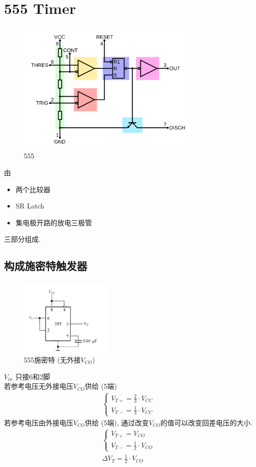 \documentclass[scheme=chinese,a4paper]{report}
\begin{document}
\section{555 Timer}
\begin{figure}[H]
\centering
\includegraphics[width=0.8\textwidth]{555_timer_1.png}
\caption{555}
\end{figure}
由
\begin{itemize}
    \item 两个比较器
    \item SR Latch
    \item 集电极开路的放电三极管
\end{itemize}
三部分组成. 
\subsection{构成施密特触发器}
\begin{figure}[H]
\centering
\includegraphics[width=0.4\textwidth]{555_schmitt.png}
\caption{555施密特 (无外接$V_{CO}$)}
\end{figure}
$V_{in}$ 只接6和2脚\\
若参考电压无外接电压$V_{CO}$供给 (5端)
\begin{align*}
    \begin{cases}
        V_{T+}=\frac{2}{3}\cdot V_{CC}\\
        V_{T-}=\frac{1}{3}\cdot V_{CC}
    \end{cases}
\end{align*}
若参考电压由外接电压$V_{CO}$供给 (5端), 通过改变$V_{CO}$的值可以改变回差电压的大小. 
\begin{align*}
    \begin{cases}
        V_{T+}=V_{CO}\\
        V_{T-}=\frac{1}{2}\cdot V_{CO}
    \end{cases}\\
    \Delta V_T=\frac{1}{2}\cdot V_{CO}
\end{align*}
\end{document}
